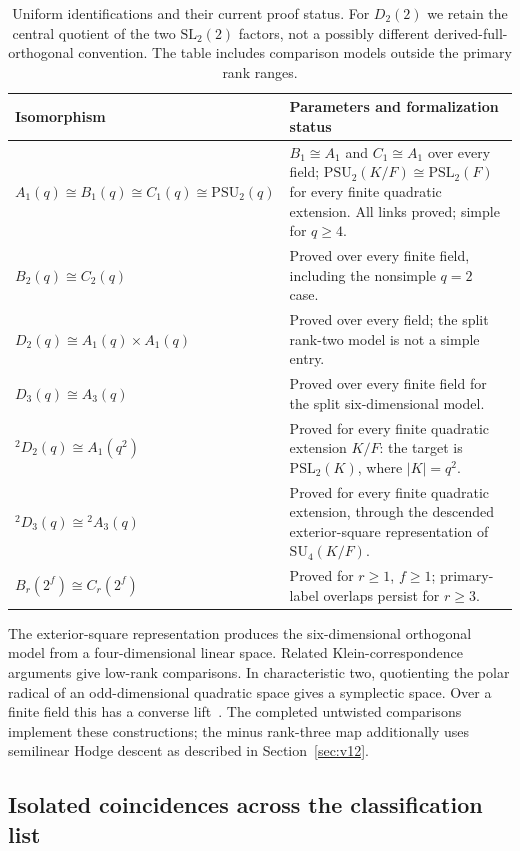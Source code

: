 \documentclass[11pt]{article}
\numberwithin{equation}{section}
\theoremstyle{definition}
\newcommand{\SL}{\mathrm{SL}}
\newcommand{\PSL}{\mathrm{PSL}}
\newcommand{\PSU}{\mathrm{PSU}}
\begin{document}
\begin{table}[!htbp]
\centering\small
\renewcommand{\arraystretch}{1.15}
\begin{tabularx}{\textwidth}{@{}p{} >{\raggedright\arraybackslash}X@{}}
\toprule
Isomorphism & Parameters and formalization status\\
\midrule
$A_1(q)\cong B_1(q)\cong C_1(q)\cong\PSU_2(q)$
& $B_1\cong A_1$ and $C_1\cong A_1$ over every field;
  $\PSU_2(K/F)\cong\PSL_2(F)$ for every finite quadratic extension.
  All links proved; simple for $q\geq4$.\\
$B_2(q)\cong C_2(q)$
 & Proved over every finite field, including the nonsimple $q=2$ case.\\
$D_2(q)\cong A_1(q)\times A_1(q)$
 & Proved over every field; the split rank-two model is not a simple entry.\\
$D_3(q)\cong A_3(q)$
 & Proved over every finite field for the split six-dimensional model.\\
$ {}^2D_2(q)\cong A_1(q^2)$
 & Proved for every finite quadratic extension $K/F$: the target is $\PSL_2(K)$, where $|K|=q^2$.\\
$ {}^2D_3(q)\cong{}^2A_3(q)$
 & Proved for every finite quadratic extension, through the descended exterior-square representation of $\mathrm{SU}_4(K/F)$.\\
$B_r(2^f)\cong C_r(2^f)$
 & Proved for $r\geq1$, $f\geq1$; primary-label overlaps persist for $r\geq3$.\\
\bottomrule
\end{tabularx}
\caption{Uniform identifications and their current proof status.
For $D_2(2)$ we retain the central quotient of the two $\SL_2(2)$
factors, not a possibly different derived-full-orthogonal convention.
The table includes comparison models outside the primary rank ranges.}
\label{tab:uniform-isos}
\end{table}

The exterior-square representation produces the six-dimensional
orthogonal model from a four-dimensional linear space. Related
Klein-correspondence arguments give low-rank comparisons. In
characteristic two, quotienting the polar radical of an odd-dimensional
quadratic space gives a symplectic space. Over a finite field this has
a converse lift~\cite[Chapters~11--12]{Taylor}. The completed untwisted
comparisons implement these constructions; the minus rank-three map additionally uses semilinear Hodge descent as described in Section~\ref{sec:v12}.

\subsection{Isolated coincidences across the classification list}
\end{document}
